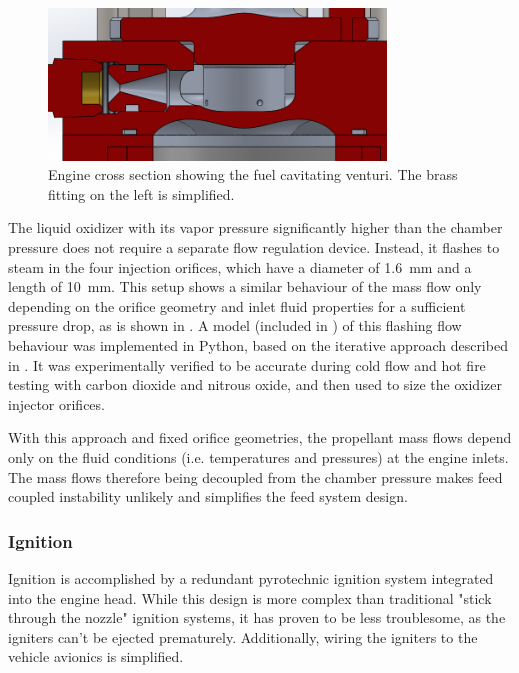 \begin{figure}[H]
\centering
\includegraphics[width=0.8\textwidth]{Propulsion/fuelVenturi.png}
\caption{Engine cross section showing the fuel cavitating venturi. The brass fitting on the left is simplified.}
\label{fig:sysarch_prop_fuelVenturi}
\end{figure}

The liquid oxidizer with its vapor pressure significantly higher than the chamber pressure does not require a separate flow regulation device. Instead, it flashes to steam in the four injection orifices, which have a diameter of \SI{1.6}{\milli\meter} and a length of \SI{10}{\milli\meter}. This setup shows a similar behaviour of the mass flow only depending on the orifice geometry and inlet fluid properties for a sufficient pressure drop, as is shown in \cite{n2o_injector_measurements}. A model (included in \cite{orleg}) of this flashing flow behaviour was implemented in Python, based on the iterative approach described in \cite[L2.4/4.2]{vdi_waermeatlas}. It was experimentally verified to be accurate during cold flow and hot fire testing with carbon dioxide and nitrous oxide, and then used to size the oxidizer injector orifices.

With this approach and fixed orifice geometries, the propellant mass flows depend only on the fluid conditions (i.e. temperatures and pressures) at the engine inlets. The mass flows therefore being decoupled from the chamber pressure makes feed coupled instability unlikely and simplifies the feed system design.

\subsubsection{Ignition}\label{sec:prop_ignition}

Ignition is accomplished by a redundant pyrotechnic ignition system integrated into the engine head. While this design is more complex than traditional "stick through the nozzle" ignition systems, it has proven to be less troublesome, as the igniters can't be ejected prematurely. Additionally, wiring the igniters to the vehicle avionics is simplified.

